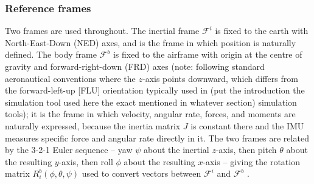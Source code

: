 \documentclass{article}
\begin{document}
\subsubsection{Reference frames}
Two frames are used throughout. The inertial frame $\mathcal{F}^{i}$ is fixed to the earth with North-East-Down (NED) axes, and is the frame in which position is naturally defined. The body frame $\mathcal{F}^{b}$ is fixed to the airframe with origin at the centre of gravity and forward-right-down (FRD) axes (note: following standard aeronautical conventions where the $z$-axis points downward, which differs from the forward-left-up [FLU] orientation typically used in (put the introduction the simulation tool used here the exact mentioned in whatever section) simulation tools); it is the frame in which velocity, angular rate, forces, and moments are naturally expressed, because the inertia matrix $J$ is constant there and the IMU measures specific force and angular rate directly in it. The two frames are related by the 3-2-1 Euler sequence -- yaw $\psi$ about the inertial $z$-axis, then pitch $\theta$ about the resulting $y$-axis, then roll $\phi$ about the resulting $x$-axis -- giving the rotation matrix $R^{b}_{i}(\phi,\theta,\psi)$ used to convert vectors between $\mathcal{F}^{i}$ and $\mathcal{F}^{b}$ \citep{beardmclain2012}.
\end{document}
